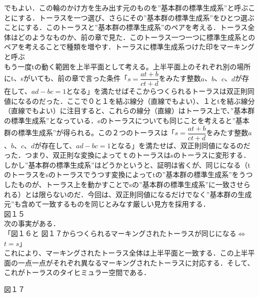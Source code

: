 でもよい．この輪のかけ方を生み出す元のものを”基本群の標準生成系”と呼ぶことにする．トーラスを一つ選び、さらにその”基本群の標準生成系”をひとつ選ぶことにする．このトーラスと”基本群の標準生成系”のペアを考える．トーラス全体はどのようなものか、前の章で見た．このトーラス一つ一つに標準生成系とのペアを考えることで種類を増やす．トーラスに標準生成系つけた印をマーキングと呼ぶ\\
もう一度tの動く範囲を上半平面として考える。上半平面上のそれぞれ別の場所にt、sがいても、前の章で言った条件「$s=\dfrac {at+b} {ct+d}$をみたす整数$a$、$b$、$c$、$d$が存在して、$ad-bc=1$となる」を満たせばそこからつくられるトーラスは双正則同値になるのだった．ここで０と１を結ぶ線分（直線でもよい）、１とtを結ぶ線分（直線でもよい）に注目すると、これらの線分（直線）はトーラス上で、”基本群の標準生成系”となっている．sのトーラスについても同じことを考えると”基本群の標準生成系”が得られる。この２つのトーラスは「$s=\dfrac {at+b} {ct+d}$をみたす整数$a$、$b$、$c$、$d$が存在して、$ad-bc=1$となる」を満たせば、双正則同値になるのだった．つまり、双正則な変換によってｔのトーラスはsのトーラスに変形する．しかし”基本群の標準生成系”はどうかというと、証明は省くが、同じになる（tのトーラスをsのトーラスでうつす変換によってtの”基本群の標準生成系”をうつしたものが、トーラス上を動かすことでsの”基本群の標準生成系”に一致させられる）とは限らないのだ．今回は、双正則同値になるだけでなく”基本群の生成元”も含めて一致するものを同じとみなす厳しい見方を採用する．\\

図１５\\

次の事実がある．\\
「図１６と 図１７からつくられるマーキングされたトーラスが同じになる$\Leftrightarrow $ $t=s$」\\
これにより、マーキングされたトーラス全体は上半平面と一致する．この上半平面の一点一点がそれぞれ異なるマーキングされたトーラスに対応する．そして、これがトーラスのタイヒミュラー空間である．

図１７







